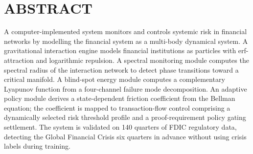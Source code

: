 \documentclass[12pt,a4paper]{article}
\begin{document}
\newpage
\section*{ABSTRACT}

A computer-implemented system monitors and controls systemic risk in
financial networks by modelling the financial system as a multi-body
dynamical system. A gravitational interaction engine models financial
institutions as particles with erf-attraction and logarithmic repulsion. A
spectral monitoring module computes the spectral radius of the interaction
network to detect phase transitions toward a critical manifold. A blind-spot
energy module computes a complementary Lyapunov function from a four-channel
failure mode decomposition. An adaptive policy module derives a
state-dependent friction coefficient from the Bellman equation; the
coefficient is mapped to transaction-flow control comprising a dynamically
selected risk threshold profile and a proof-requirement policy gating
settlement. The system is validated on 140 quarters of FDIC regulatory data,
detecting the Global Financial Crisis six quarters in advance without using
crisis labels during training.
\end{document}
